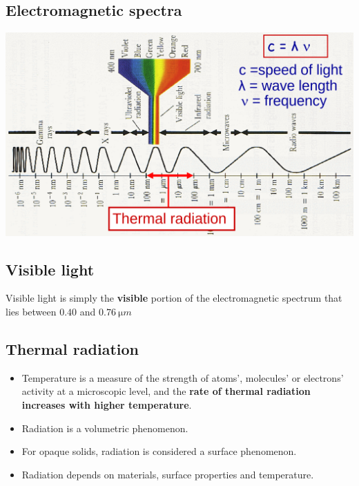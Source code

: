 \documentclass[11pt]{article}
\begin{document}
\subsection{Electromagnetic spectra}
\label{sec:org105acb5}
\begin{center}
\includegraphics[width=.9\linewidth]{./images/electromagnetic-spectra.png}
\end{center}

\subsection{Visible light}
\label{sec:org8b164f5}
Visible light is simply the \textbf{visible} portion of the electromagnetic spectrum that lies between \(0.40\) and \(\qty{0.76}{\micro m}\)

 \newpage

\subsection{Thermal radiation}
\label{sec:org9866652}
\begin{itemize}
\item Temperature is a measure of the strength of atoms', molecules' or electrons' activity at a microscopic level, and the \textbf{rate of thermal radiation increases with higher temperature}.
\item Radiation is a volumetric phenomenon.
\item For opaque solids, radiation is considered a surface phenomenon.
\item Radiation depends on materials, surface properties and temperature.
\end{itemize}
\end{document}
